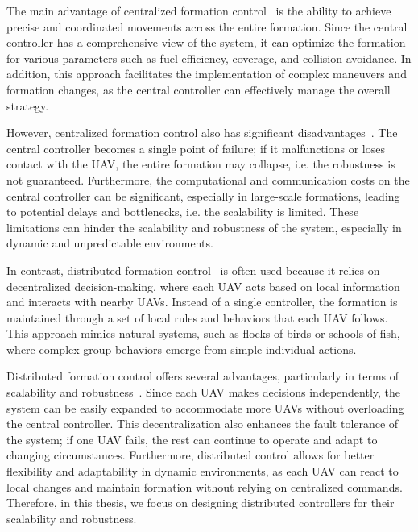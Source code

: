 The main advantage of centralized formation control~\cite{Oh2015,1545539,Brando2015,Liu2018} is the ability to achieve precise and coordinated movements across the entire formation. Since the central controller has a comprehensive view of the system, it can optimize the formation for various parameters such as fuel efficiency, coverage, and collision avoidance. In addition, this approach facilitates the implementation of complex maneuvers and formation changes, as the central controller can effectively manage the overall strategy.

However, centralized formation control also has significant disadvantages~\cite{Oh2015,Liu2018,Ahn2020,9123564}. The central controller becomes a single point of failure; if it malfunctions or loses contact with the UAV, the entire formation may collapse, i.e. the robustness is not guaranteed. Furthermore, the computational and communication costs on the central controller can be significant, especially in large-scale formations, leading to potential delays and bottlenecks, i.e. the scalability is limited. These limitations can hinder the scalability and robustness of the system, especially in dynamic and unpredictable environments.

In contrast, distributed formation control~\cite{Oh2015,Ahn2020} is often used because it relies on decentralized decision-making, where each UAV acts based on local information and interacts with nearby UAVs. Instead of a single controller, the formation is maintained through a set of local rules and behaviors that each UAV follows. This approach mimics natural systems, such as flocks of birds or schools of fish, where complex group behaviors emerge from simple individual actions.

Distributed formation control offers several advantages, particularly in terms of scalability and robustness~\cite{Oh2015,Liu2018,Ahn2020,AlonsoMora2018,7452570}. Since each UAV makes decisions independently, the system can be easily expanded to accommodate more UAVs without overloading the central controller. This decentralization also enhances the fault tolerance of the system; if one UAV fails, the rest can continue to operate and adapt to changing circumstances. Furthermore, distributed control allows for better flexibility and adaptability in dynamic environments, as each UAV can react to local changes and maintain formation without relying on centralized commands. Therefore, in this thesis, we focus on designing distributed controllers for their scalability and robustness.

